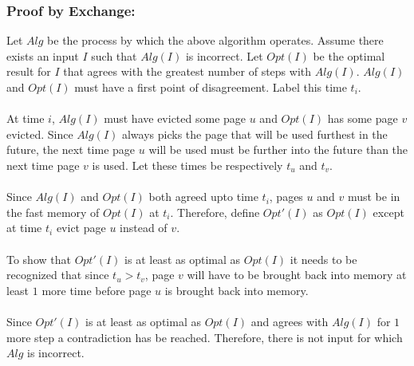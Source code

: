 \documentclass[12pt]{article}
\begin{document}
\subsubsection*{Proof by Exchange:}
Let $Alg$ be the process by which the above algorithm operates.
Assume there exists an input $I$ such that $Alg(I)$ is 
incorrect.  Let $Opt(I)$ be the optimal result for $I$
that agrees with the greatest number of steps with $Alg(I)$.
$Alg(I)$ and $Opt(I)$ must have a first point of disagreement.
Label this time $t_i$.\\\\
At time $i$, $Alg(I)$ must have evicted some page $u$ and 
$Opt(I)$ has some page $v$ evicted.  Since $Alg(I)$ always
picks the page that will be used furthest in the future,
the next time page $u$ will be used must be further into
the future than the next time page $v$ is used.  Let these
times be respectively $t_u$ and $t_v$.\\\\
Since $Alg(I)$ and $Opt(I)$ both agreed upto time $t_i$,
pages $u$ and $v$ must be in the fast memory of $Opt(I)$
at $t_i$.  Therefore, define $Opt'(I)$ as $Opt(I)$ except
at time $t_i$ evict page $u$ instead of $v$.\\\\
To show that $Opt'(I)$ is at least as optimal as $Opt(I)$     
it needs to be recognized that since $t_u > t_v$, page $v$
will have to be brought back into memory at least $1$ more
time before page $u$ is brought back into memory.\\\\
Since $Opt'(I)$ is at least as optimal as $Opt(I)$ and 
agrees with $Alg(I)$ for $1$ more step a contradiction has
be reached.  Therefore, there is not input for which $Alg$
is incorrect.   
\end{document}
